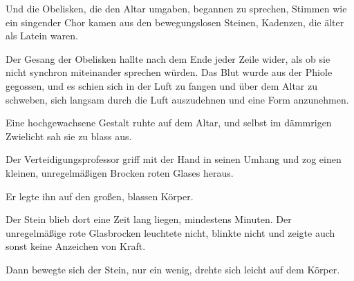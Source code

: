 Und die Obelisken, die den Altar umgaben, begannen zu sprechen, Stimmen wie ein singender Chor kamen aus den bewegungslosen Steinen, Kadenzen, die älter als Latein waren.



Der Gesang der Obelisken hallte nach dem Ende jeder Zeile wider, als ob sie nicht synchron miteinander sprechen würden. Das Blut wurde aus der Phiole gegossen, und es schien sich in der Luft zu fangen und über dem Altar zu schweben, sich langsam durch die Luft auszudehnen und eine Form anzunehmen.



Eine hochgewachsene Gestalt ruhte auf dem Altar, und selbst im dämmrigen Zwielicht sah sie zu blass aus.

Der Verteidigungsprofessor griff mit der Hand in seinen Umhang und zog einen kleinen, unregelmäßigen Brocken roten Glases heraus.

Er legte ihn auf den großen, blassen Körper.

Der Stein blieb dort eine Zeit lang liegen, mindestens Minuten. Der unregelmäßige rote Glasbrocken leuchtete nicht, blinkte nicht und zeigte auch sonst keine Anzeichen von Kraft.

Dann bewegte sich der Stein, nur ein wenig, drehte sich leicht auf dem Körper.

